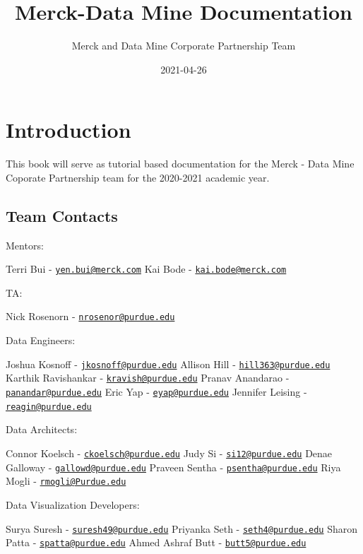\documentclass[]{book}
\title{Merck-Data Mine Documentation}
\author{Merck and Data Mine Corporate Partnership Team}
\date{2021-04-26}
\begin{document}
\maketitle

{
\setcounter{tocdepth}{1}
\tableofcontents
}
\chapter{Introduction}\label{introduction}

This book will serve as tutorial based documentation for the Merck -
Data Mine Coporate Partnership team for the 2020-2021 academic year.

\section{Team Contacts}\label{team-contacts}

Mentors:

Terri Bui -
\href{mailto:yen.bui@merck.com}{\nolinkurl{yen.bui@merck.com}} Kai Bode
- \href{mailto:kai.bode@merck.com}{\nolinkurl{kai.bode@merck.com}}

TA:

Nick Rosenorn -
\href{mailto:nrosenor@purdue.edu}{\nolinkurl{nrosenor@purdue.edu}}

Data Engineers:

Joshua Kosnoff -
\href{mailto:jkosnoff@purdue.edu}{\nolinkurl{jkosnoff@purdue.edu}}
Allison Hill -
\href{mailto:hill363@purdue.edu}{\nolinkurl{hill363@purdue.edu}} Karthik
Ravishankar -
\href{mailto:kravish@purdue.edu}{\nolinkurl{kravish@purdue.edu}} Pranav
Anandarao -
\href{mailto:panandar@purdue.edu}{\nolinkurl{panandar@purdue.edu}} Eric
Yap - \href{mailto:eyap@purdue.edu}{\nolinkurl{eyap@purdue.edu}}
Jennifer Leising -
\href{mailto:reagin@purdue.edu}{\nolinkurl{reagin@purdue.edu}}

Data Architects:

Connor Koelsch -
\href{mailto:ckoelsch@purdue.edu}{\nolinkurl{ckoelsch@purdue.edu}} Judy
Si - \href{mailto:si12@purdue.edu}{\nolinkurl{si12@purdue.edu}} Denae
Galloway -
\href{mailto:gallowd@purdue.edu}{\nolinkurl{gallowd@purdue.edu}} Praveen
Sentha -
\href{mailto:psentha@purdue.edu}{\nolinkurl{psentha@purdue.edu}} Riya
Mogli - \href{mailto:rmogli@Purdue.edu}{\nolinkurl{rmogli@Purdue.edu}}

Data Visualization Developers:

Surya Suresh -
\href{mailto:suresh49@purdue.edu}{\nolinkurl{suresh49@purdue.edu}}
Priyanka Seth -
\href{mailto:seth4@purdue.edu}{\nolinkurl{seth4@purdue.edu}} Sharon
Patta - \href{mailto:spatta@purdue.edu}{\nolinkurl{spatta@purdue.edu}}
Ahmed Ashraf Butt -
\href{mailto:butt5@purdue.edu}{\nolinkurl{butt5@purdue.edu}}
\end{document}
